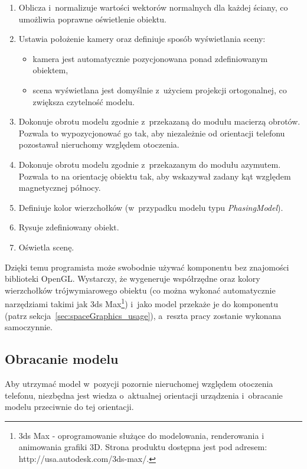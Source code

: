 \documentclass[a4paper,twocolumn,11pt]{article}
\begin{document}
 \begin{enumerate}
  \item Oblicza i~normalizuje wartości wektorów normalnych dla każdej ściany, co umożliwia poprawne oświetlenie obiektu.
  \item Ustawia położenie kamery oraz definiuje sposób wyświetlania sceny:
   \begin{itemize}
    \item kamera jest automatycznie pozycjonowana ponad zdefiniowanym obiektem,
    \item scena wyświetlana jest domyślnie z~użyciem projekcji ortogonalnej, co zwiększa czytelność modelu.
   \end{itemize}
  \item Dokonuje obrotu modelu zgodnie z~przekazaną do modułu macierzą obrotów.
   Pozwala to wypozycjonować go tak, aby niezależnie od orientacji telefonu pozostawał nieruchomy względem otoczenia.
  \item Dokonuje obrotu modelu zgodnie z~przekazanym do modułu azymutem.
   Pozwala to na orientację obiektu tak, aby wskazywał zadany kąt względem magnetycznej północy.
  \item Definiuje kolor wierzchołków (w~przypadku modelu typu \emph{PhasingModel}).
  \item Rysuje zdefiniowany obiekt.
  \item Oświetla scenę.
 \end{enumerate}

 Dzięki temu programista może swobodnie używać komponentu bez znajomości biblioteki OpenGL.
 Wystarczy, że wygeneruje współrzędne oraz kolory wierzchołków trójwymiarowego obiektu (co można wykonać automatycznie narzędziami takimi jak 3ds Max\footnote{3ds Max - oprogramowanie służące do modelowania, renderowania i animowania grafiki 3D. Strona produktu dostępna jest pod adresem: http://usa.autodesk.com/3ds-max/.}) i~jako model przekaże je do komponentu (patrz sekcja~\ref{sec:spaceGraphics_usage}), a~reszta pracy zostanie wykonana samoczynnie.

\subsection{Obracanie modelu}
 Aby utrzymać model w~pozycji pozornie nieruchomej względem otoczenia telefonu, niezbędna jest wiedza o~aktualnej orientacji urządzenia i~obracanie modelu przeciwnie do tej orientacji.
\end{document}
